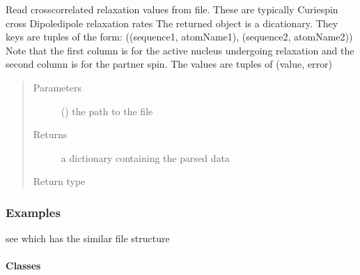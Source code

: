 \documentclass[a4paper,10pt,english,openany,oneside]{sphinxmanual}
\begin{document}
\begin{fulllineitems}
\label{\detokenize{reference/generated/paramagpy.dataparse.read_ccr:paramagpy.dataparse.read_ccr}}
\sphinxAtStartPar
Read cross\sphinxhyphen{}correlated relaxation values from file.
These are typically Curie\sphinxhyphen{}spin cross Dipole\sphinxhyphen{}dipole relaxation rates
The returned object is a dicationary.
They keys are tuples of the form:
((sequence1, atomName1), (sequence2, atomName2))
Note that the first column is for the active nucleus undergoing
relaxation and the second column is for the partner spin.
The values are tuples of (value, error)
\begin{quote}\begin{description}
\item[{Parameters}] \leavevmode
\sphinxAtStartPar
{} () \textendash{} the path to the file

\item[{Returns}] \leavevmode
\sphinxAtStartPar
{} \textendash{} a dictionary containing the parsed data

\item[{Return type}] \leavevmode
\sphinxAtStartPar
{\hyperref[\detokenize{reference/generated/paramagpy.dataparse.DataContainer:paramagpy.dataparse.DataContainer}]{}}

\end{description}\end{quote}
\subsubsection*{Examples}

\sphinxAtStartPar
see {\hyperref[\detokenize{reference/generated/paramagpy.dataparse.read_rdc:paramagpy.dataparse.read_rdc}]{}} which has the similar file structure

\end{fulllineitems}



\paragraph{Classes}
\label{\detokenize{reference/dataparse:classes}}
\end{document}
